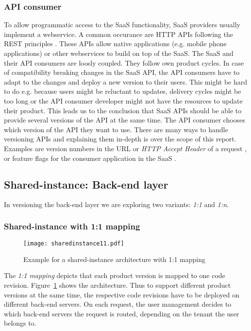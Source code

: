 \subsubsection{API consumer} To allow programmatic access to the SaaS functionality, SaaS providers usually implement a webservice. A common occurance are HTTP APIs following the REST principles \cite{Fielding2000}. These APIs allow native applications (e.g. mobile phone applications) or other webservices to build on top of the SaaS. The SaaS and their API consumers are loosly coupled. They follow own product cycles. In case of compatibility breaking changes in the SaaS API, the API consumers have to adapt to the changes and deploy a new version to their users. This might be hard to do e.g. because users might be reluctant to updates, delivery cycles might be too long or the API consumer developer might not have the resources to update their product. This leads us to the conclusion that SaaS APIs should be able to provide several versions of the API at the same time. The API consumer chooses which version of the API they want to use. There are many ways to handle versioning APIs and explaining them in-depth is over the scope of this report. Examples are version numbers in the URL or \emph{HTTP Accept Header} of a request \cite{RFC2616}, or feature flags for the consumer application in the SaaS \cite{playbook2013}.


\subsection{Shared-instance: Back-end layer}

In versioning the back-end layer we are exploring two variants: \emph{1:1} and \emph{1:n}.

\subsubsection{Shared-instance with 1:1 mapping}

\begin{figure}
\centering
\texttt{[image: sharedinstance11.pdf]}
\caption{Example for a shared-instance architecture with 1:1 mapping}
\label{fig:sharedinstance11}
\end{figure}

The \emph{1:1 mapping} depicts that each product version is mapped to one code revision. Figure~\ref{fig:sharedinstance11} shows the architecture. Thus to support different product versions at the same time, the respective code revisions have to be deployed on different back-end servers. On each request, the user management decides to which back-end servers the request is routed, depending on the tenant the user belongs to.

